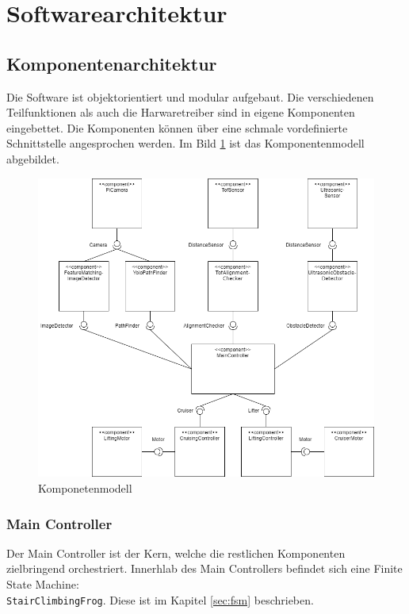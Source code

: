 \section{Softwarearchitektur}
\subsection{Komponentenarchitektur}
Die Software ist objektorientiert und modular aufgebaut. Die verschiedenen Teilfunktionen als auch die Harwaretreiber sind in eigene Komponenten eingebettet. Die Komponenten können über eine schmale vordefinierte Schnittstelle angesprochen werden. Im Bild \ref{fig:komponentenmodell} ist das Komponentenmodell abgebildet. 

\begin{figure}[H]
  \includegraphics[width=1\textwidth]{img/softwarearchitektur/Softwarearchitektur.png}
  \centering
  \caption{Komponetenmodell}
  \label{fig:komponentenmodell}
\end{figure}

\subsubsection{Main Controller}
Der Main Controller ist der Kern, welche die restlichen Komponenten zielbringend orchestriert. Innerhlab des Main Controllers befindet sich eine Finite State Machine:\\ \texttt{StairClimbingFrog}. Diese ist im Kapitel \ref{sec:fsm} beschrieben. 

